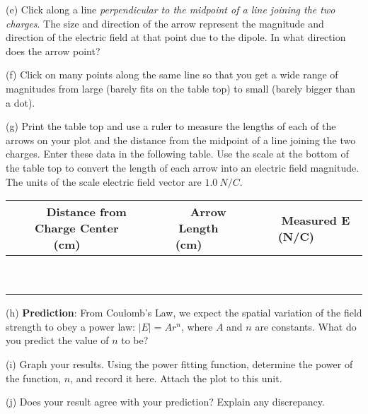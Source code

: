(e) Click along a line \textit{perpendicular to the midpoint of a line joining the two charges}. The size and direction of the arrow represent the magnitude and direction of the electric field at that point due to the dipole.
In what direction does the arrow point?
\vspace{15mm}

(f) Click on many points along the same line so that you get a wide range of 
magnitudes from large (barely fits on the table top) to small (barely bigger 
than a dot).

(g) Print the table top and use a ruler to measure the lengths of each of the 
arrows on your plot and the distance from the midpoint of a line joining the 
two charges. Enter these data in the following table. Use the scale at the 
bottom of the table top to convert the length of each arrow into an electric 
field magnitude. The units of the scale electric field vector are $1.0 ~ N/C$.

\vspace{0.3cm}
{\centering \begin{tabular}{|c|c|c|}
\hline 
~~~Distance from Charge Center (cm)~~~&
~~~Arrow Length (cm)~~~&
~~~Measured E (N/C)~~~\\
\hline
\hline 
&
&
\\
\hline 
&
&
\\
\hline 
&
&
\\
\hline 
&
&
\\
\hline 
&
&
\\
\hline 
&
&
\\
\hline 
&
&
\\
\hline 
&
&
\\
\hline 
&
&
\\
\hline
\end{tabular}\par}
\vspace{0.3cm}


(h) \textbf{Prediction}: From Coulomb's Law, we expect the spatial variation
of the field strength to obey a power law: \( \left| E\right| =Ar^{n} \),
where \( A \) and \( n \) are constants. What do you predict the
value of \( n \) to be?\vspace{15mm}

(i) Graph your results. Using the power fitting
function, determine the power of the function, $n$, and record it here.
Attach the plot to this unit.
\vspace{15mm}

(j) Does your result agree with your prediction? Explain any discrepancy.\vspace{15mm}

